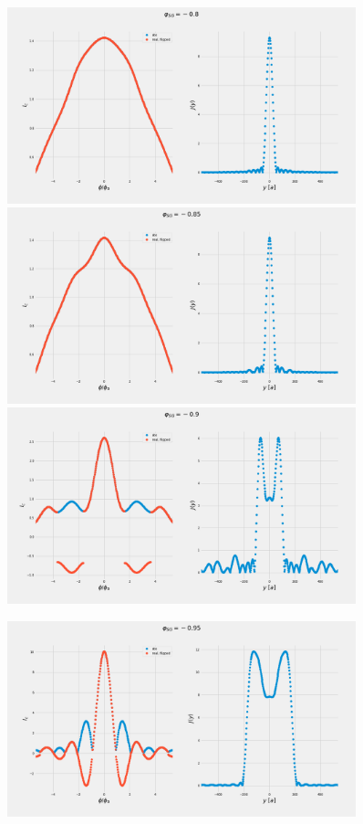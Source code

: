 \documentclass[a4paper]{article}
\begin{document}
\begin{figure}
	\includegraphics[width=0.9\textwidth]{figs/wg32vbg05/current_and_density_08}
	\includegraphics[width=0.9\textwidth]{figs/wg32vbg05/current_and_density_085}
	\includegraphics[width=0.9\textwidth]{figs/wg32vbg05/current_and_density_09}
\end{figure}
\begin{figure}
	\includegraphics[width=0.9\textwidth]{figs/wg32vbg05/current_and_density_095}
\end{figure}
\end{document}
